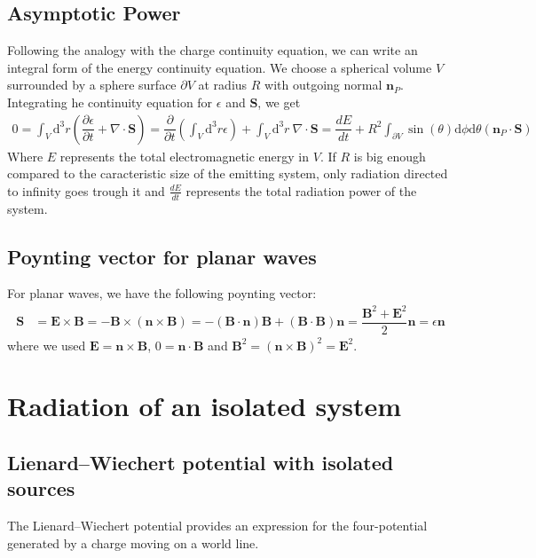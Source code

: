 \documentclass[10pt, a4paper]{article}
\begin{document}
{\subsection{Asymptotic Power}
Following the analogy with the charge continuity equation, we can write an integral form of the energy continuity equation. We choose a spherical volume $V$ surrounded by a sphere surface $\partial V$ at radius $R$ with outgoing normal $\mathbf{n}_P$. Integrating he continuity equation for $\epsilon$ and $\mathbf{S}$, we get 
\begin{align*}
   0 = \int_V \text{d}^3 r \left(\dfrac{\partial \epsilon}{\partial t} + \nabla  \cdot \mathbf{S}\right) = \dfrac{\partial }{\partial t} \left(\int_V \text{d}^3 r \epsilon\right) + \int_V \text{d}^3 r \ \nabla  \cdot \mathbf{S} = \dfrac{d E}{d t}  + R^2\int_{\partial V} \sin(\theta) \text{d}\phi \text{d}\theta (\mathbf{n}_P \cdot \mathbf{S})
\end{align*}
Where $E$ represents the total electromagnetic energy in $V$. If $R$ is big enough compared to the caracteristic size of the emitting system, only radiation directed to infinity goes trough it and $\frac{dE}{dt}$ represents the total radiation power of the system. 

\subsection{Poynting vector for planar waves}
For planar waves, we have the following poynting vector:
\begin{align*}
    \mathbf{S} &= \mathbf{E}\times\mathbf{B} = -\mathbf{B} \times (\mathbf{n} \times \mathbf{B}) =- (\mathbf{B} \cdot \mathbf{n}) \mathbf{B} + (\mathbf{B} \cdot \mathbf{B}) \mathbf{n} = \dfrac{\mathbf{B}^2 + \mathbf{E}^2}{2} \mathbf{n} = \epsilon \mathbf{n} 
\end{align*}
where we used $\mathbf{E} = \mathbf{n} \times \mathbf{B}$, $0 = \mathbf{n} \cdot \mathbf{B}$ and $\mathbf{B}^2 = (\mathbf{n} \times \mathbf{B})^2 =  \mathbf{E}^2$. 
\section{Radiation of an isolated system}
\subsection{Lienard–Wiechert potential with isolated sources}
The Lienard–Wiechert potential provides an expression for the four-potential generated by a charge moving on a world line. 

}
\end{document}

